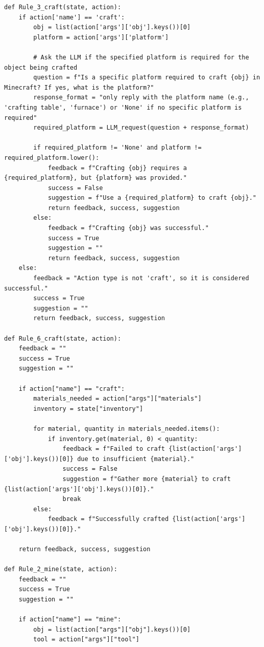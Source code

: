 \documentclass{article} %
\begin{document}
\lstset{language=}
\begin{lstlisting}
def Rule_3_craft(state, action):
    if action['name'] == 'craft':
        obj = list(action['args']['obj'].keys())[0]
        platform = action['args']['platform']
        
        # Ask the LLM if the specified platform is required for the object being crafted
        question = f"Is a specific platform required to craft {obj} in Minecraft? If yes, what is the platform?"
        response_format = "only reply with the platform name (e.g., 'crafting table', 'furnace') or 'None' if no specific platform is required"
        required_platform = LLM_request(question + response_format)
        
        if required_platform != 'None' and platform != required_platform.lower():
            feedback = f"Crafting {obj} requires a {required_platform}, but {platform} was provided."
            success = False
            suggestion = f"Use a {required_platform} to craft {obj}."
            return feedback, success, suggestion
        else:
            feedback = f"Crafting {obj} was successful."
            success = True
            suggestion = ""
            return feedback, success, suggestion
    else:
        feedback = "Action type is not 'craft', so it is considered successful."
        success = True
        suggestion = ""
        return feedback, success, suggestion

def Rule_6_craft(state, action):
    feedback = ""
    success = True
    suggestion = ""

    if action["name"] == "craft":
        materials_needed = action["args"]["materials"]
        inventory = state["inventory"]

        for material, quantity in materials_needed.items():
            if inventory.get(material, 0) < quantity:
                feedback = f"Failed to craft {list(action['args']['obj'].keys())[0]} due to insufficient {material}."
                success = False
                suggestion = f"Gather more {material} to craft {list(action['args']['obj'].keys())[0]}."
                break
        else:
            feedback = f"Successfully crafted {list(action['args']['obj'].keys())[0]}."

    return feedback, success, suggestion

def Rule_2_mine(state, action):
    feedback = ""
    success = True
    suggestion = ""

    if action["name"] == "mine":
        obj = list(action["args"]["obj"].keys())[0]
        tool = action["args"]["tool"]


\end{lstlisting}
\end{document}
